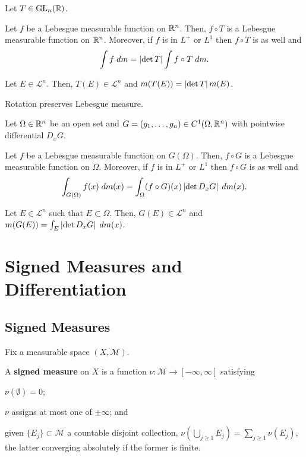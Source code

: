 \documentclass[11pt]{article}
\renewcommand{\L}{\mathcal{L}}
\newcommand{\M}{\mathcal{M}}
\begin{document}
\begin{theorem}
Let $T\in\textup{GL}_n(\mathbb{R})$. 
\begin{enum}{\alph}
\item Let $f$ be a Lebesgue measurable function on $\mathbb{R}^n$. Then, $f\circ T$ is a Lebesgue measurable function on $\mathbb{R}^n$. Moreover, if $f$ is in $L^+$ or $L^1$ then $f\circ T$ is as well and 
$$\int f\;dm=\left\lvert\det T\right\rvert\int f\circ T\;dm.$$
\item Let $E\in\L^n$. Then, $T(E)\in\L^n$ and $m(T(E))=\left\lvert\det T\right\rvert m(E)$.
\end{enum}
\end{theorem}

\begin{corollary}
Rotation preserves Lebesgue measure.
\end{corollary}

\begin{theorem}
Let $\Omega\in\mathbb{R}^n$ be an open set and $G=(g_1,\ldots,g_n)\in C^1(\Omega,\mathbb{R}^n)$ with pointwise differential $D_xG$. 
\begin{enum}{\alph}
\item Let $f$ be a Lebesgue measurable function on $G(\Omega)$. Then, $f\circ G$ is a Lebesgue measurable function on $\Omega$. Moreover, if $f$ is in $L^+$ or $L^1$ then $f\circ G$ is as well and 
$$\int_{G(\Omega)}f(x)\;dm(x)=\int_{\Omega}(f\circ G)(x)\left\lvert\det D_xG\right\rvert\;dm(x).$$
\item Let $E\in\L^n$ such that $E\subset\Omega$. Then, $G(E)\in\L^n$ and $m(G(E))=\int_E\left\lvert\det D_xG\right\rvert\;dm(x)$.
\end{enum}
\end{theorem}

\section{Signed Measures and Differentiation}
\subsection{Signed Measures}
Fix a measurable space $(X,\M)$. 

\begin{definition}
A \textbf{signed measure} on $X$ is a function $\nu: \M\to[-\infty,\infty]$ satisfying
\begin{enum}{\arabic}
\item $\nu(\emptyset)=0$;
\item $\nu$ assigns at most one of $\pm\infty$; and
\item given $\{E_j\}\subset\M$ a countable disjoint collection, $\nu(\bigcup_{j\geq1}E_j)=\sum_{j\geq1}\nu(E_j)$, the latter converging absolutely if the former is finite.
\end{enum}
\end{definition}
\end{document}
